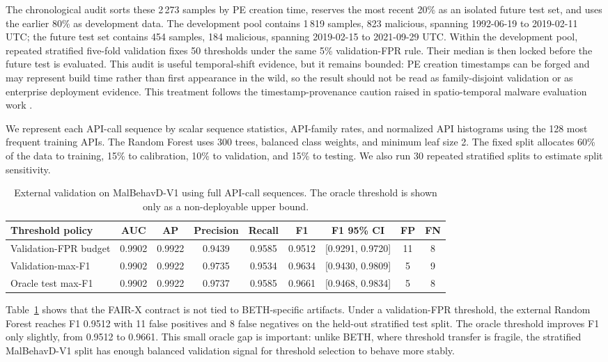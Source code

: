 \documentclass[10pt,journal,compsoc]{IEEEtran}
\begin{document}
The chronological audit sorts these 2\,273 samples by PE creation time, reserves the most recent 20\% as an isolated future test set, and uses the earlier 80\% as development data. The development pool contains 1\,819 samples, 823 malicious, spanning 1992-06-19 to 2019-02-11 UTC; the future test set contains 454 samples, 184 malicious, spanning 2019-02-15 to 2021-09-29 UTC. Within the development pool, repeated stratified five-fold validation fixes 50 thresholds under the same 5\% validation-FPR rule. Their median is then locked before the future test is evaluated. This audit is useful temporal-shift evidence, but it remains bounded: PE creation timestamps can be forged and may represent build time rather than first appearance in the wild, so the result should not be read as family-disjoint validation or as enterprise deployment evidence. This treatment follows the timestamp-provenance caution raised in spatio-temporal malware evaluation work \cite{chow2025breaking}.

We represent each API-call sequence by scalar sequence statistics, API-family rates, and normalized API histograms using the 128 most frequent training APIs. The Random Forest uses 300 trees, balanced class weights, and minimum leaf size 2. The fixed split allocates 60\% of the data to training, 15\% to calibration, 10\% to validation, and 15\% to testing. We also run 30 repeated stratified splits to estimate split sensitivity.

\begin{table}[t]
\centering
\caption{External validation on MalBehavD-V1 using full API-call sequences. The oracle threshold is shown only as a non-deployable upper bound.}
\label{tab:malbehavd_external}
\begin{tabular}{lcccccccc}
\toprule
\textbf{Threshold policy} & \textbf{AUC} & \textbf{AP} & \textbf{Precision} & \textbf{Recall} & \textbf{F1} & \textbf{F1 95\% CI} & \textbf{FP} & \textbf{FN} \\
\midrule
Validation-FPR budget & 0.9902 & 0.9922 & 0.9439 & 0.9585 & 0.9512 & [0.9291, 0.9720] & 11 & 8 \\
Validation-max-F1 & 0.9902 & 0.9922 & 0.9735 & 0.9534 & 0.9634 & [0.9430, 0.9809] & 5 & 9 \\
Oracle test max-F1 & 0.9902 & 0.9922 & 0.9737 & 0.9585 & 0.9661 & [0.9468, 0.9834] & 5 & 8 \\
\bottomrule
\end{tabular}
\end{table}

Table~\ref{tab:malbehavd_external} shows that the FAIR-X contract is not tied to BETH-specific artifacts. Under a validation-FPR threshold, the external Random Forest reaches F1 0.9512 with 11 false positives and 8 false negatives on the held-out stratified test split. The oracle threshold improves F1 only slightly, from 0.9512 to 0.9661. This small oracle gap is important: unlike BETH, where threshold transfer is fragile, the stratified MalBehavD-V1 split has enough balanced validation signal for threshold selection to behave more stably.
\end{document}
